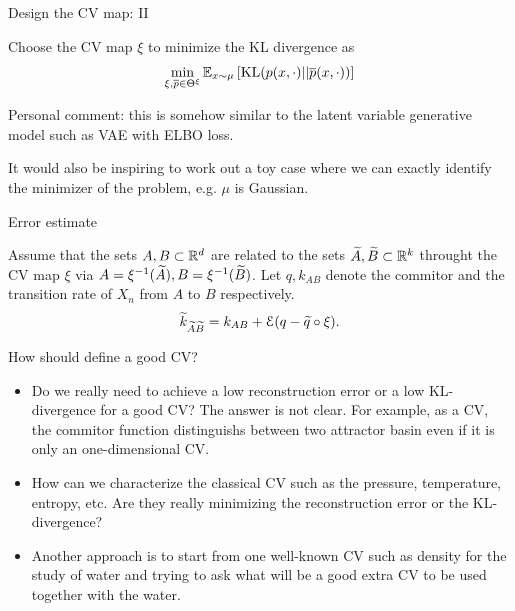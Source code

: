 \documentclass{beamer}
\begin{document}
\begin{frame}{Design the CV map: II}
	\begin{theorem}
		Choose the CV map $\xi$ to minimize the KL divergence as
		\begin{equation*}
			\min_{\xi, \overline{p} \in \Theta^{\xi}} \mathbb{E}_{x\sim \mu} \left[\operatorname{KL}(p(x, \cdot)||\overline{p}(x, \cdot))\right]
		\end{equation*}
	\end{theorem}

	Personal comment: this is somehow similar to the latent variable generative model
	such as VAE with ELBO loss.

	It would also be inspiring to work out a toy case where we can exactly identify the
	minimizer of the problem, e.g. $\mu$ is Gaussian.
\end{frame}

\begin{frame}{Error estimate}
	\begin{theorem}
		Assume that the sets $A, B \subset \mathbb{R}^d$ are related to the sets
		$\widetilde A, \widetilde B \subset \mathbb{R}^k$ throught the CV map $\xi$ via
		$A = \xi^{-1}(\widetilde A), B = \xi^{-1}(\widetilde B)$. Let $q, k_{AB}$ denote the
		commitor and the transition rate of $X_n$ from $A$ to $B$ respectively.
		\begin{equation*}
			\widetilde k_{\widetilde A\widetilde B} = k_{AB} + \mathcal{E}(q - \widetilde q \circ \xi).
		\end{equation*}
	\end{theorem}
\end{frame}

\begin{frame}{How should define a good CV?}
	\begin{itemize}
		\item Do we really need to achieve a low reconstruction error or a low KL-divergence
		for a good CV? The answer is not clear. For example, as a CV, the commitor function
		distinguishs between two attractor basin even if it is only an one-dimensional CV.
		\item How can we characterize the classical CV such as the pressure, temperature,
		entropy, etc. Are they really minimizing the reconstruction error or the KL-divergence?
		\item Another approach is to start from one well-known CV such as density for the study
		of water and trying to ask what will be a good extra CV to be used together with the
		water.
	\end{itemize}
\end{frame}
\end{document}
